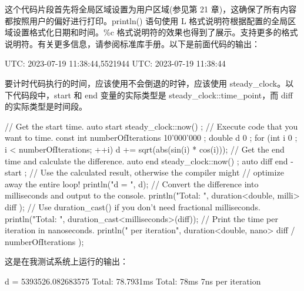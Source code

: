 这个代码片段首先将全局区域设置为用户区域(参见第 21 章)，这确保了所有内容都按照用户的偏好进行打印。println() 语句使用 L 格式说明符根据配置的全局区域设置格式化日期和时间。\%c 格式说明符的效果也得到了展示。支持更多的格式说明符。有关更多信息，请参阅标准库手册。以下是前面代码的输出：

\begin{shell}
UTC: 2023-07-19 11:38:44,5521944
UTC: 2023-07-19 11:38:44
\end{shell}


要计时代码执行的时间，应该使用不会倒退的时钟，应该使用 steady\_clock。以下代码段中，start 和 end 变量的实际类型是 steady\_clock::time\_point，而 diff 的实际类型是时间段。

\begin{cpp}
// Get the start time.
auto start { steady_clock::now() };
// Execute code that you want to time.
const int numberOfIterations { 10'000'000 };
double d { 0 };
for (int i { 0 }; i < numberOfIterations; ++i) { d += sqrt(abs(sin(i) * cos(i))); }
// Get the end time and calculate the difference.
auto end { steady_clock::now() };
auto diff { end - start };
// Use the calculated result, otherwise the compiler might
// optimize away the entire loop!
println("d = {}", d);
// Convert the difference into milliseconds and output to the console.
println("Total: {}", duration<double, milli> { diff });
// Use duration_cast() if you don't need fractional milliseconds.
println("Total: {}", duration_cast<milliseconds>(diff));
// Print the time per iteration in nanoseconds.
println("{} per iteration", duration<double, nano> { diff / numberOfIterations });
\end{cpp}

这是在我测试系统上运行的输出：

\begin{shell}
d = 5393526.082683575
Total: 78.7931ms
Total: 78ms
7ns per iteration
\end{shell}

